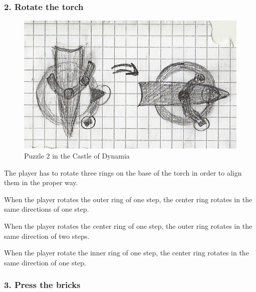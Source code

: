 \subsubsection{2. Rotate the torch}

\begin{figure}[H]
  \centering
  \includegraphics[width=\textwidth]{Images/Puzzles/castleOfDynamia_2}
  \caption{Puzzle 2 in the Castle of Dynamia}
\end{figure}



The player has to rotate three rings on the base of the torch in order to align them in the proper way.

When the player rotates the outer ring of one step, the center ring rotates in the same directions of one step.

When the player rotates the center ring of one step, the outer ring rotates in the same direction of two steps.

When the player rotate the inner ring of one step, the center ring rotates in the same direction of one step.

\subsubsection{3. Press the bricks}

